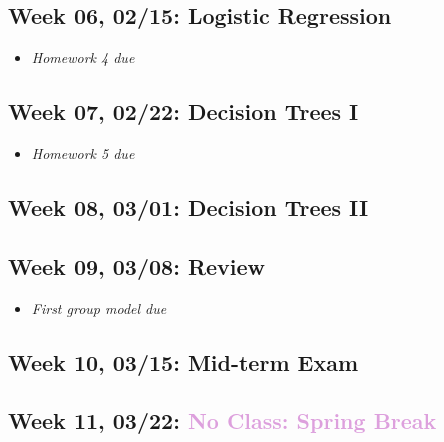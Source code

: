 \documentclass[11pt,]{article}
\providecommand{\tightlist}{%
  \setlength{\itemsep}{0pt}\setlength{\parskip}{0pt}}
\begin{document}
\hypertarget{week-06-0215-logistic-regression}{%
\subsection{Week 06, 02/15: Logistic
Regression}\label{week-06-0215-logistic-regression}}

\begin{itemize}
\tightlist
\item
  \emph{\textcolor{Bittersweet}{Homework 4 due}}
\end{itemize}

\hypertarget{week-07-0222-decision-trees-i}{%
\subsection{Week 07, 02/22: Decision Trees
I}\label{week-07-0222-decision-trees-i}}

\begin{itemize}
\tightlist
\item
  \emph{\textcolor{Bittersweet}{Homework 5 due}}
\end{itemize}

\hypertarget{week-08-0301-decision-trees-ii}{%
\subsection{Week 08, 03/01: Decision Trees
II}\label{week-08-0301-decision-trees-ii}}

\hypertarget{week-09-0308-review}{%
\subsection{Week 09, 03/08: Review}\label{week-09-0308-review}}

\begin{itemize}
\tightlist
\item
  \emph{\textcolor{Bittersweet}{First group model due}}
\end{itemize}

\hypertarget{week-10-0315-mid-term-exam}{%
\subsection{Week 10, 03/15: Mid-term
Exam}\label{week-10-0315-mid-term-exam}}

\hypertarget{week-11-0322}{%
\subsection{\texorpdfstring{Week 11, 03/22:
\textcolor{Plum}{No Class: Spring Break}}{Week 11, 03/22: }}\label{week-11-0322}}
\end{document}
